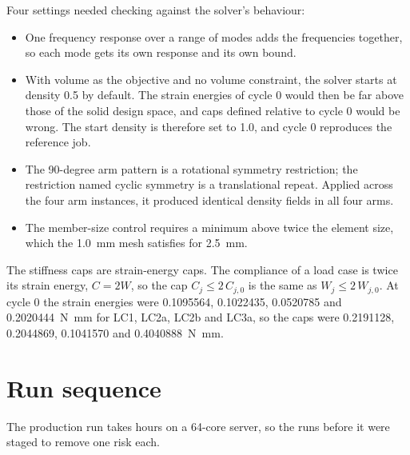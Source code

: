 Four settings needed checking against the solver's behaviour:

\begin{itemize}
\item One frequency response over a range of modes adds the frequencies together, so each mode gets its own response and its own bound.
\item With volume as the objective and no volume constraint, the solver starts at density 0.5 by default. The strain energies of cycle 0 would then be far above those of the solid design space, and caps defined relative to cycle 0 would be wrong. The start density is therefore set to 1.0, and cycle 0 reproduces the reference job.
\item The 90-degree arm pattern is a rotational symmetry restriction; the restriction named cyclic symmetry is a translational repeat. Applied across the four arm instances, it produced identical density fields in all four arms.
\item The member-size control requires a minimum above twice the element size, which the \SI{1.0}{mm} mesh satisfies for \SI{2.5}{mm}.
\end{itemize}

The stiffness caps are strain-energy caps. The compliance of a load case is twice its strain energy, $C = 2W$, so the cap $C_j \le 2\,C_{j,0}$ is the same as $W_j \le 2\,W_{j,0}$. At cycle 0 the strain energies were \num{0.1095564}, \num{0.1022435}, \num{0.0520785} and \SI{0.2020444}{N.mm} for LC1, LC2a, LC2b and LC3a, so the caps were \num{0.2191128}, \num{0.2044869}, \num{0.1041570} and \SI{0.4040888}{N.mm}.

\section{Run sequence}\label{sec:optimisation_model-sequence}

The production run takes hours on a 64-core server, so the runs before it were staged to remove one risk each.

